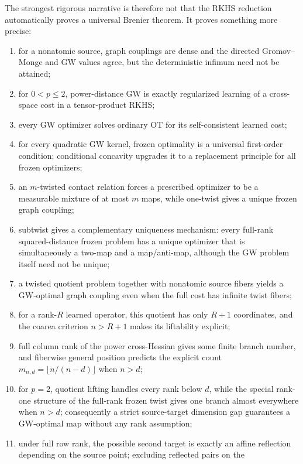 \documentclass[11pt,a4paper]{article}
\theoremstyle{definition}
\theoremstyle{remark}
\begin{document}
The strongest rigorous narrative is therefore not that the RKHS reduction
automatically proves a universal Brenier theorem.  It proves something more
precise:
\begin{enumerate}[label=\arabic*.]
  \item for a nonatomic source, graph couplings are dense and the directed
  Gromov--Monge and GW values agree, but the deterministic infimum need not be
  attained;
  \item for \(0<p\leq2\), power-distance GW is exactly regularized learning
  of a cross-space cost in a tensor-product RKHS;
  \item every GW optimizer solves ordinary OT for its self-consistent learned
  cost;
  \item for every quadratic GW kernel, frozen optimality is a universal
  first-order condition; conditional concavity upgrades it to a replacement
  principle for all frozen optimizers;
  \item an \(m\)-twisted contact relation forces a prescribed optimizer to be a
  measurable mixture of at most \(m\) maps, while one-twist gives a unique
  frozen graph coupling;
  \item subtwist gives a complementary uniqueness mechanism: every full-rank
  squared-distance frozen problem has a unique optimizer that is simultaneously
  a two-map and a map/anti-map, although the GW problem itself need not be
  unique;
  \item a twisted quotient problem together with nonatomic source fibers
  yields a GW-optimal graph coupling even when the full cost has infinite
  twist fibers;
  \item for a rank-\(R\) learned operator, this quotient has only \(R+1\)
  coordinates, and the coarea criterion \(n>R+1\) makes its liftability
  explicit;
  \item full column rank of the power cross-Hessian gives some finite branch
  number, and fiberwise general position predicts the explicit count
  \(m_{n,d}=\lfloor n/(n-d)\rfloor\) when \(n>d\);
  \item for \(p=2\), quotient lifting handles every rank below \(d\), while
  the special rank-one structure of the full-rank frozen twist gives one
  branch almost everywhere when \(n>d\); consequently a strict source-target
  dimension gap guarantees a GW-optimal map without any rank assumption;
  \item under full row rank, the possible second target is exactly an affine
  reflection depending on the source point; excluding reflected pairs on the

\end{enumerate}
\end{document}
